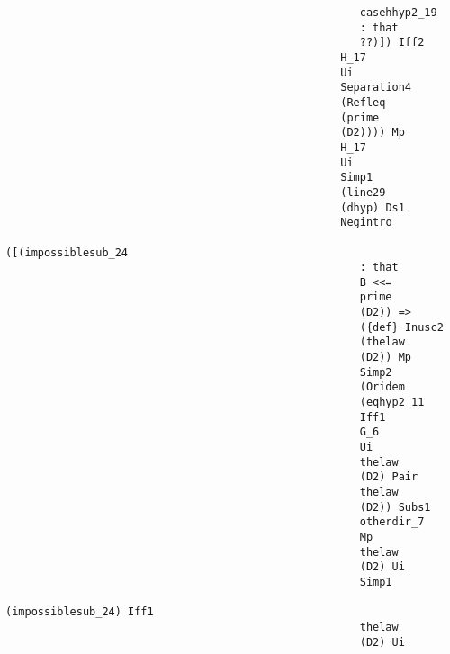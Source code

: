\documentclass[12pt]{article}
\begin{document}
\begin{verbatim}
                                                       casehhyp2_19 
                                                       : that 
                                                       ??)]) Iff2 
                                                    H_17 
                                                    Ui 
                                                    Separation4 
                                                    (Refleq 
                                                    (prime 
                                                    (D2)))) Mp 
                                                    H_17 
                                                    Ui 
                                                    Simp1 
                                                    (line29 
                                                    (dhyp) Ds1 
                                                    Negintro 
                                                    ([(impossiblesub_24 
                                                       : that 
                                                       B <<= 
                                                       prime 
                                                       (D2)) => 
                                                       ({def} Inusc2 
                                                       (thelaw 
                                                       (D2)) Mp 
                                                       Simp2 
                                                       (Oridem 
                                                       (eqhyp2_11 
                                                       Iff1 
                                                       G_6 
                                                       Ui 
                                                       thelaw 
                                                       (D2) Pair 
                                                       thelaw 
                                                       (D2)) Subs1 
                                                       otherdir_7 
                                                       Mp 
                                                       thelaw 
                                                       (D2) Ui 
                                                       Simp1 
                                                       (impossiblesub_24) Iff1 
                                                       thelaw 
                                                       (D2) Ui 

\end{verbatim}
\end{document}
